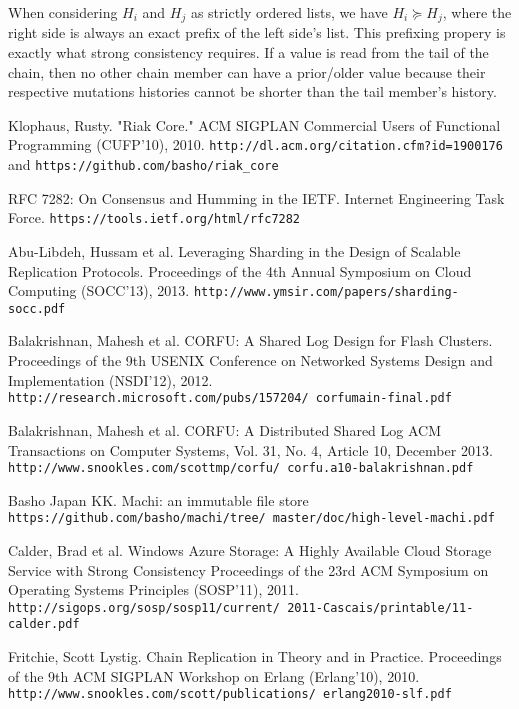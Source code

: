 \documentclass[preprint,10pt]{sigplanconf}
\begin{document}
When considering $H_i$ and $H_j$ as strictly ordered lists, we have 
$H_i \succeq H_j$, where the right side is always an exact prefix of the left
side's list.  This prefixing propery is exactly what strong
consistency requires.  If a value is read from the tail of the chain,
then no other chain member can have a prior/older value because their
respective mutations histories cannot be shorter than the tail
member's history.


\begin{thebibliography}{}
\softraggedright

Klophaus, Rusty.
"Riak Core."
ACM SIGPLAN Commercial Users of Functional Programming (CUFP'10), 2010.
{\tt http://dl.acm.org/citation.cfm?id=1900176} and
{\tt https://github.com/basho/riak\_core}

RFC 7282: On Consensus and Humming in the IETF.
Internet Engineering Task Force.
{\tt https://tools.ietf.org/html/rfc7282}

Abu-Libdeh, Hussam et al.
Leveraging Sharding in the Design of Scalable Replication Protocols.
Proceedings of the 4th Annual Symposium on Cloud Computing (SOCC'13), 2013.
{\tt http://www.ymsir.com/papers/sharding-socc.pdf}

Balakrishnan, Mahesh et al.
CORFU: A Shared Log Design for Flash Clusters.
Proceedings of the 9th USENIX Conference on Networked Systems Design
and Implementation (NSDI'12), 2012.
{\tt http://research.microsoft.com/pubs/157204/ corfumain-final.pdf}

Balakrishnan, Mahesh et al.
CORFU: A Distributed Shared Log
ACM Transactions on Computer Systems, Vol. 31, No. 4, Article 10, December 2013.
{\tt http://www.snookles.com/scottmp/corfu/ corfu.a10-balakrishnan.pdf}

Basho Japan KK.
Machi: an immutable file store
{\tt https://github.com/basho/machi/tree/ master/doc/high-level-machi.pdf}

Calder, Brad et al.
Windows Azure Storage: A Highly Available Cloud Storage Service with Strong Consistency
Proceedings of the 23rd ACM Symposium on Operating Systems Principles (SOSP'11), 2011.
{\tt http://sigops.org/sosp/sosp11/current/ 2011-Cascais/printable/11-calder.pdf}

Fritchie, Scott Lystig.
Chain Replication in Theory and in Practice.
Proceedings of the 9th ACM SIGPLAN Workshop on Erlang (Erlang'10), 2010.
{\tt http://www.snookles.com/scott/publications/ erlang2010-slf.pdf}


\end{thebibliography}
\end{document}
